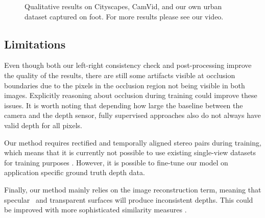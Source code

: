 \documentclass[10pt,twocolumn,letterpaper]{article}
\begin{document}
\begin{figure}[!hb]
  \centering
  \vspace{2pt}
\vspace{3pt}
  \caption{Qualitative results on Cityscapes, CamVid, and our own urban dataset captured on foot. For more results please see our video.}
  \label{fig:others}
\end{figure}



\subsection{Limitations}
Even though both our left-right consistency check and post-processing improve the quality of the results, there are still some artifacts visible at occlusion boundaries due to the pixels in the occlusion region not being visible in both images. 
Explicitly reasoning about occlusion during training \cite{hoiem2007recovering, humayun_CVPR_2011_occlusions} could improve these issues.
It is worth noting that depending how large the baseline between the camera and the depth sensor, fully supervised approaches also do not always have valid depth for all pixels.

Our method requires rectified and temporally aligned stereo pairs during training, which means that it is currently not possible to use existing single-view datasets for training purposes \eg \cite{Silberman:ECCV12}. 
However, it is possible to fine-tune our model on application specific ground truth depth data.

Finally, our method mainly relies on the image reconstruction term, meaning that specular~\cite{godard2015multi} and transparent surfaces will produce inconsistent depths. 
This could be improved with more sophisticated similarity measures \cite{vzbontar2016stereo}.
\end{document}

